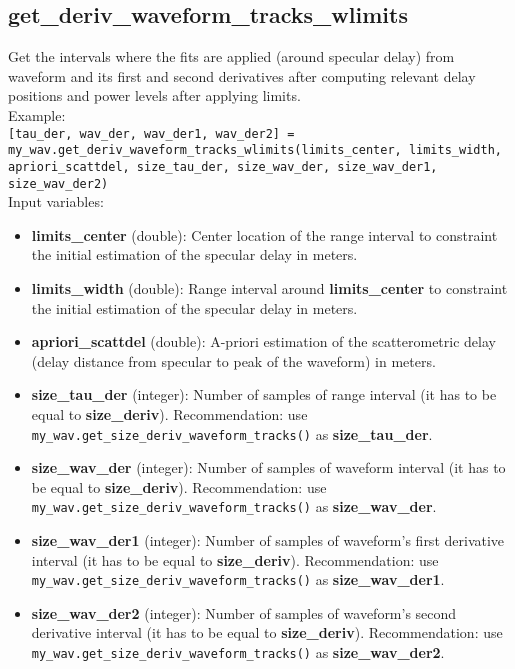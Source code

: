 \subsection{get\_deriv\_waveform\_tracks\_wlimits}

Get the intervals where the fits are applied (around specular delay) from waveform and its first and second derivatives after computing relevant delay positions and power levels after applying limits.\\

Example:\\

\texttt{[tau\_der, wav\_der, wav\_der1, wav\_der2] = my\_wav.get\_deriv\_waveform\_tracks\_wlimits(limits\_center, limits\_width, apriori\_scattdel, size\_tau\_der, size\_wav\_der, size\_wav\_der1, size\_wav\_der2)}\\

Input variables:
\begin{itemize}
\item {\bf limits\_center} (double): Center location of the range interval to constraint the initial estimation of the specular delay in meters.
\item {\bf limits\_width} (double): Range interval around {\bf limits\_center} to constraint the initial estimation of the specular delay in meters.
\item {\bf apriori\_scattdel} (double): A-priori estimation of the scatterometric delay (delay distance from specular to peak of the waveform) in meters.
\item {\bf size\_tau\_der} (integer): Number of samples of range interval (it has to be equal to {\bf size\_deriv}). Recommendation: use \texttt{my\_wav.get\_size\_deriv\_waveform\_tracks()} as {\bf size\_tau\_der}.
\item {\bf size\_wav\_der} (integer): Number of samples of waveform interval (it has to be equal to {\bf size\_deriv}). Recommendation: use \texttt{my\_wav.get\_size\_deriv\_waveform\_tracks()} as {\bf size\_wav\_der}.
\item {\bf size\_wav\_der1} (integer): Number of samples of waveform's first derivative interval (it has to be equal to {\bf size\_deriv}). Recommendation: use \texttt{my\_wav.get\_size\_deriv\_waveform\_tracks()} as {\bf size\_wav\_der1}.
\item {\bf size\_wav\_der2} (integer): Number of samples of waveform's second derivative interval (it has to be equal to {\bf size\_deriv}). Recommendation: use \texttt{my\_wav.get\_size\_deriv\_waveform\_tracks()} as {\bf size\_wav\_der2}.
\end{itemize}


